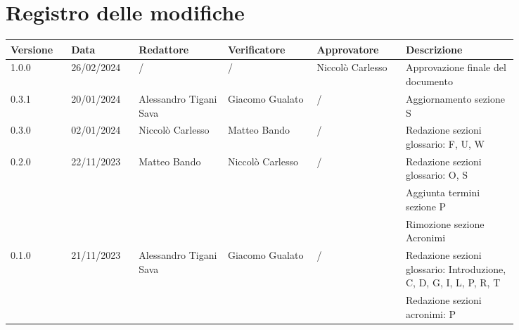 \section*{Registro delle modifiche}
{
\renewcommand{\arraystretch}{1.5}
\scriptsize
\begin{longtable}{p{0.10\linewidth}p{0.10\linewidth}p{0.15\linewidth}p{0.15\linewidth}p{0.15\linewidth}p{0.19\linewidth}}
	\textbf{Versione} & \textbf{Data} & \textbf{Redattore}     & \textbf{Verificatore} & \textbf{Approvatore} & \textbf{Descrizione}	\\
	\toprule
	1.0.0	& 26/02/2024	& /						& /						& Niccolò Carlesso	& Approvazione finale del documento	\\
	\hline
	0.3.1	& 20/01/2024    & Alessandro Tigani Sava&	Giacomo Gualato		& /	& Aggiornamento sezione S	\\
	\hline
	0.3.0	& 02/01/2024    & Niccolò Carlesso		&	Matteo Bando		& /	& Redazione sezioni glossario: F, U, W	\\
	\hline
	0.2.0	& 22/11/2023    & Matteo Bando			&	Niccolò Carlesso	& /	& Redazione sezioni glossario: O, S	\\
			&               &						&						&	& Aggiunta termini sezione P		\\
			&               &						&						&	& Rimozione sezione Acronimi		\\
	\hline
	0.1.0	& 21/11/2023    & Alessandro Tigani Sava&	Giacomo Gualato		& /	& Redazione sezioni glossario: Introduzione, C, D, G, I, L, P, R, T 	\\
			&               &						&						&	& Redazione sezioni acronimi: P		\\
	\bottomrule
\end{longtable}
}
